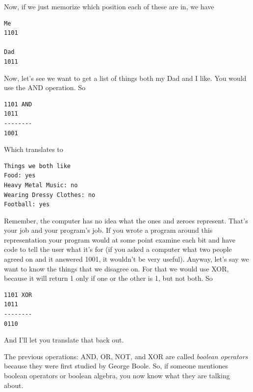Now, if we just memorize which position each of these are in, we have

\begin{simpletyping}
\begin{lstlisting}
Me
1101

Dad
1011
\end{lstlisting}
\end{simpletyping}

Now, let's see we want to get a list of things both my Dad and I like.
You would use the AND operation.  So

\begin{simpletyping}
\begin{lstlisting}
1101 AND
1011
--------
1001
\end{lstlisting}
\end{simpletyping}

Which translates to

\begin{simpletyping}
\begin{lstlisting}
Things we both like
Food: yes
Heavy Metal Music: no
Wearing Dressy Clothes: no
Football: yes
\end{lstlisting}
\end{simpletyping}

Remember, the computer has no idea what the ones and zeroes represent.
That's your job and your program's job.  If you wrote a program
around this representation your program would at some point examine
each bit and have code to tell the user what it's for (if you asked a computer
what two people agreed on and it answered 1001, it wouldn't be very
useful).  Anyway, let's say we want to know the things that we disagree
on.  For that we would use XOR, because it will return 1 only if one
or the other is 1, but not both.  So

\begin{simpletyping}
\begin{lstlisting}
1101 XOR
1011
--------
0110
\end{lstlisting}
\end{simpletyping}

And I'll let you translate that back out.  

The previous operations: AND, OR, NOT, and XOR are called 
\emph{boolean operators} 
because they were first studied by George Boole.  
So, if someone mentiones boolean operators or 
boolean algebra, 
you now know what they are talking about.

